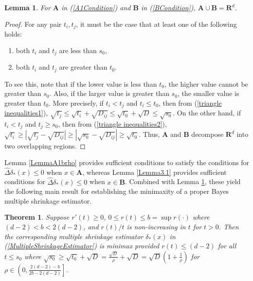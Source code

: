 \documentclass[11pt]{article}
\newtheorem{theorem}{Theorem}
\newtheorem{lemma}{Lemma}
\theoremstyle{definition}
\begin{document}
\begin{lemma} \label{Lemma3.4}
For  $\textbf{A}$ in (\ref{A1Condition}) and $\textbf{B}$ in (\ref{BCondition}), $\textbf{A} \cup \textbf{B} = \mathbf{R}^d$.
\end{lemma}
\begin{proof}
For any pair $t_i, t_j$, it must be the case that at least one of the following holds:
\begin{enumerate}
    \item[(i)] both $t_i$ and $t_j$ are less than $s_0$, 
    \item[(ii)] both $t_i$ and $t_j$ are greater than $t_0$.
\end{enumerate}
To see this, note that if the lower value is less than $t_0$, the higher value cannot be greater than $s_0$. Also, if the larger value is greater than $s_0$, the smaller value is greater than $t_0$. More precisely, if $t_i < t_j$ and $t_i \leq t_0$, then from (\ref{triangle inequalities1}), $\sqrt{t_j} \leq \sqrt{t_i} + \sqrt{D_{ij}} \leq \sqrt{t_0} + \sqrt{D} \leq \sqrt{s_0}$.  On the other hand, if $t_i < t_j$ and $t_j \geq s_0$, then from (\ref{triangle inequalities2}), $\sqrt{t_i} \geq |\sqrt{t_j} - \sqrt{D_{ij}}| \geq  |\sqrt{s_0} - \sqrt{D_{ij}}| \geq \sqrt{t_0}$. Thus, $\textbf{A}$ and $\textbf{B}$ decompose $\mathbf{R}^d$ into two overlapping regions.
\end{proof}

Lemma \ref{LemmaA1brho} provides sufficient conditions to satisfy the conditions
for $\hat{\Delta}\delta_*(x) \le 0$ when $x \in \textbf{A}$, whereas Lemma \ref{Lemma3.1} provides sufficient conditions for $\hat{\Delta}\delta_*(x) \le 0$ when $x \in \textbf{B}$.   Combined with Lemma \ref{Lemma3.4}, these yield the following main result for establishing the minimaxity of a proper Bayes multiple shrinkage estimator. 


\begin{theorem}\label{Theorem3.5}
   Suppose $r'(t) \ge 0$, $0 \leq r(t) \leq b = \sup r(\cdot)$ where $(d-2) < b < 2(d-2)$, and $r(t)/t$ is non-increasing in $t$ for $t>0$.  Then the corresponding multiple shrinkage estimator $\delta_{*}(x)$ in (\ref{MultipleShrinkageEstimator}) is minimax provided $r(t) \leq  (d-2)$ for all $t \leq s_0$ where $ \sqrt{s_0} \geq \sqrt{t_0} + \sqrt{D} = \frac{\sqrt{D}}{\rho} + \sqrt{D} = \sqrt{D}\left(1 + \frac{1}{\rho}\right)$ for $\rho \in \left(0, \frac{2(d - 2) - b}{2b - 2(d - 2)}\right]$.
    \label{MainResult}
\end{theorem}
\end{document}
